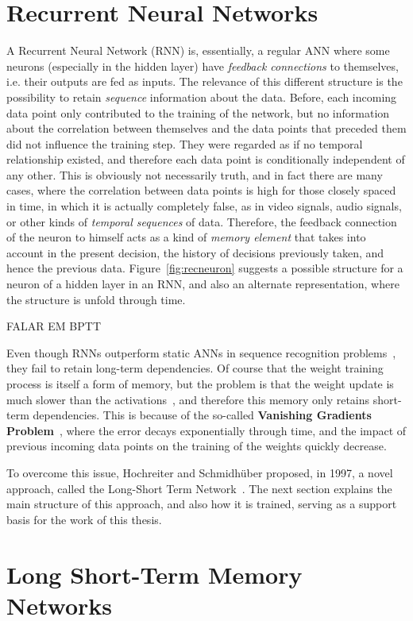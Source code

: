 \section{Recurrent Neural Networks}\label{sec:theorBack_rnn}
A Recurrent Neural Network (RNN) is, essentially, a regular ANN where some neurons (especially in the hidden layer) have \emph{feedback connections} to themselves, i.e. their outputs are fed as inputs. The relevance of this different structure is the possibility to retain \emph{sequence} information about the data. Before, each incoming data point only contributed to the training of the network, but no information about the correlation between themselves and the data points that preceded them did not influence the training step. They were regarded as if no temporal relationship existed, and therefore each data point is conditionally independent of any other. This is obviously not necessarily truth, and in fact there are many cases, where the correlation between data points is high for those closely spaced in time, in which it is actually completely false, as in video signals, audio signals, or other kinds of \emph{temporal sequences} of data. Therefore, the feedback connection of the neuron to himself acts as a kind of \emph{memory element} that takes into account in the present decision, the history of decisions previously taken, and hence the previous data. 
Figure~\ref{fig:recneuron} suggests a possible structure for a neuron of a hidden layer in an RNN, and also an alternate representation, where the structure is unfold through time.


FALAR EM BPTT

Even though RNNs outperform static ANNs in sequence recognition problems~\citep{Bengio1991}, they fail to retain long-term dependencies. Of course that the weight training process is itself a form of memory, but the problem is that the weight update is much slower than the activations~\citep{Yoshua01}, and therefore this memory only retains short-term dependencies. This is because of the so-called \textbf{Vanishing Gradients Problem}~\citep{Yoshua94,Yoshua01}, where the error decays exponentially through time, and the impact of previous incoming data points on the training of the weights quickly decrease. 

To overcome this issue, Hochreiter and Schmidhüber proposed, in 1997, a novel approach, called the Long-Short Term Network~\citep{Hoch97}. The next section explains the main structure of this approach, and also how it is trained, serving as a support basis for the work of this thesis.

\section{Long Short-Term Memory Networks}\label{sec:theorBack_lstm}


